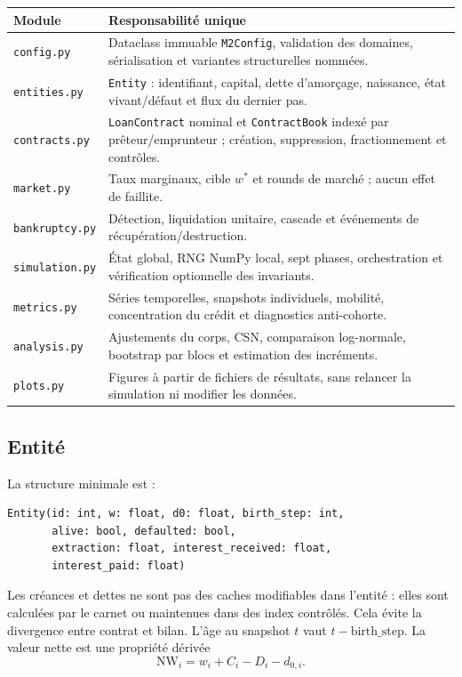 \documentclass[11pt,a4paper]{article}
\newcommand{\NW}{\mathrm{NW}}
\newcommand{\code}[1]{\texttt{#1}}
\begin{document}
\begin{longtable}{p{}p{}}
\toprule
Module & Responsabilité unique \\
\midrule
\endhead
\code{config.py} & Dataclass immuable \code{M2Config}, validation des domaines,
sérialisation et variantes structurelles nommées. \\
\code{entities.py} & \code{Entity} : identifiant, capital, dette d'amorçage,
naissance, état vivant/défaut et flux du dernier pas. \\
\code{contracts.py} & \code{LoanContract} nominal et \code{ContractBook} indexé
par prêteur/emprunteur ; création, suppression, fractionnement et contrôles. \\
\code{market.py} & Taux marginaux, cible $w^*$ et rounds de marché ; aucun effet
de faillite. \\
\code{bankruptcy.py} & Détection, liquidation unitaire, cascade et événements de
récupération/destruction. \\
\code{simulation.py} & État global, RNG NumPy local, sept phases, orchestration
et vérification optionnelle des invariants. \\
\code{metrics.py} & Séries temporelles, snapshots individuels, mobilité,
concentration du crédit et diagnostics anti-cohorte. \\
\code{analysis.py} & Ajustements du corps, CSN, comparaison log-normale,
bootstrap par blocs et estimation des incréments. \\
\code{plots.py} & Figures à partir de fichiers de résultats, sans relancer la
simulation ni modifier les données. \\
\bottomrule
\end{longtable}

\subsection{Entité}

La structure minimale est :
\begin{verbatim}
Entity(id: int, w: float, d0: float, birth_step: int,
       alive: bool, defaulted: bool,
       extraction: float, interest_received: float,
       interest_paid: float)
\end{verbatim}
Les créances et dettes ne sont pas des caches modifiables dans l'entité : elles
sont calculées par le carnet ou maintenues dans des index contrôlés. Cela évite
la divergence entre contrat et bilan. L'âge au snapshot $t$ vaut
$t-\text{birth\_step}$. La valeur nette est une propriété dérivée
\[
\NW_i=w_i+C_i-D_i-d_{0,i}.
\]
\end{document}

